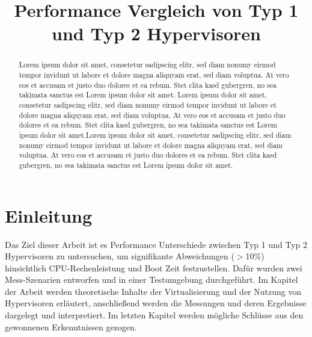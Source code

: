 \documentclass[conference]{IEEEtran}
\begin{document}
\title{Performance Vergleich von Typ 1 und Typ 2 Hypervisoren }

\author
{
}

\maketitle

\begin{abstract}
Lorem ipsum dolor sit amet, consetetur sadipscing elitr, sed diam nonumy eirmod tempor invidunt ut labore et dolore magna aliquyam erat, sed diam voluptua. At vero eos et accusam et justo duo dolores et ea rebum. Stet clita kasd gubergren, no sea takimata sanctus est Lorem ipsum dolor sit amet. Lorem ipsum dolor sit amet, consetetur sadipscing elitr, sed diam nonumy eirmod tempor invidunt ut labore et dolore magna aliquyam erat, sed diam voluptua. At vero eos et accusam et justo duo dolores et ea rebum. Stet clita kasd gubergren, no sea takimata sanctus est Lorem ipsum dolor sit amet.Lorem ipsum dolor sit amet, consetetur sadipscing elitr, sed diam nonumy eirmod tempor invidunt ut labore et dolore magna aliquyam erat, sed diam voluptua. At vero eos et accusam et justo duo dolores et ea rebum. Stet clita kasd gubergren, no sea takimata sanctus est Lorem ipsum dolor sit amet.
\end{abstract}

\IEEEpeerreviewmaketitle

\section{Einleitung}
\label{Einleitung}

Das Ziel dieser Arbeit ist es Performance Unterschiede zwischen Typ 1 und Typ 2 Hypervisoren zu untersuchen, um signifikante Abweichungen ($>$10\%) hinsichtlich CPU-Rechenleistung und Boot Zeit festzustellen. Dafür wurden zwei Mess-Szenarien entworfen und in einer Testumgebung durchgeführt. Im Kapitel der Arbeit werden theoretische Inhalte der Virtualisierung und der Nutzung von Hypervisoren erläutert, anschließend werden die Messungen und deren Ergebnisse dargelegt und interpretiert. Im letzten Kapitel werden mögliche Schlüsse aus den gewonnenen Erkenntnissen gezogen.
\end{document}
